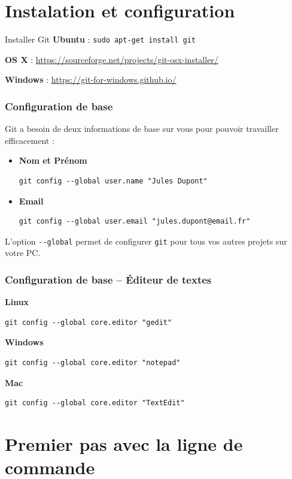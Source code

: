 \documentclass{beamer}
\begin{document}
\section{Instalation et configuration}
\begin{frame}{Installer Git}
\textbf{Ubuntu} : \lstinline{sudo apt-get install git}

\textbf{OS X} : \url{https://sourceforge.net/projects/git-osx-installer/}

\textbf{Windows} : \url{https://git-for-windows.github.io/}
\end{frame}

\begin{frame}[fragile]
\frametitle{Configuration de base}

Git a besoin de deux informations de base sur vous pour pouvoir travailler efficacement :

\begin{itemize}
\item \textbf{Nom et Prénom}
\begin{lstlisting}
git config --global user.name "Jules Dupont"
\end{lstlisting}

\item \textbf{Email}
\begin{lstlisting}
git config --global user.email "jules.dupont@email.fr"
\end{lstlisting}
\end{itemize}

L'option \lstinline{--global} permet de configurer \texttt{git} pour tous vos autres projets sur votre PC.
\end{frame}

\begin{frame}[fragile]
\frametitle{Configuration de base -- Éditeur de textes}
\textbf{Linux}\begin{lstlisting}
git config --global core.editor "gedit"
\end{lstlisting}\textbf{Windows}\begin{lstlisting}
git config --global core.editor "notepad"
\end{lstlisting}
\textbf{Mac}\begin{lstlisting}
git config --global core.editor "TextEdit"
\end{lstlisting}
\end{frame}

\section{Premier pas avec la ligne de commande}
\end{document}
